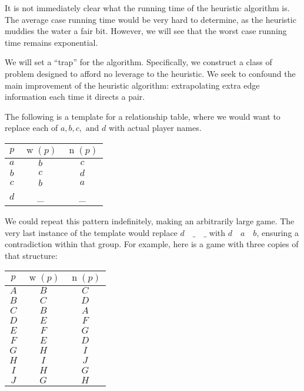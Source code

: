 \documentclass[12pt,x11names, rgb]{article}
\DeclareMathOperator{\w}{w}
\DeclareMathOperator{\n}{n}
\begin{document}
    It is not immediately clear what the running time of the heuristic algorithm is. The average case running time would be very hard to determine, as the heuristic muddies the water a fair bit. However, we will see that the worst case running time remains exponential.

    We will set a ``trap'' for the algorithm. Specifically, we construct a class of problem designed to afford no leverage to the heuristic. We seek to confound the main improvement of the heuristic algorithm: extrapolating extra edge information each time it directs a pair. 

    The following is a template for a relationship table, where we would want to replace each of $a, b, c, \text{ and }d$ with actual player names.

    \begin{center}
        \begin{tabular}{c | c | c}
            $p$ & $\w(p)$ & $\n(p)$\\
            \hline
            $a$ & $b$ & $c$\\
            $b$ & $c$ & $d$\\
            $c$ & $b$ & $a$\\
            $d$ & \_ & \_
        \end{tabular}
    \end{center}

    We could repeat this pattern indefinitely, making an arbitrarily large game. The very last instance of the template would replace $d \quad \_ \quad \_$ with $d \quad a \quad b$, ensuring a contradiction within that group. For example, here is a game with three copies of that structure:

    \begin{center}
        \begin{tabular}{c | c | c}
            $p$ & $\w(p)$ & $\n(p)$\\
            \hline
            $A$ & $B$ & $C$\\
            $B$ & $C$ & $D$\\
            $C$ & $B$ & $A$\\
            \hline
            $D$ & $E$ & $F$\\
            $E$ & $F$ & $G$\\
            $F$ & $E$ & $D$\\
            \hline
            $G$ & $H$ & $I$\\
            $H$ & $I$ & $J$\\
            $I$ & $H$ & $G$\\
            $J$ & $G$ & $H$
        \end{tabular}
    \end{center}
\end{document}
